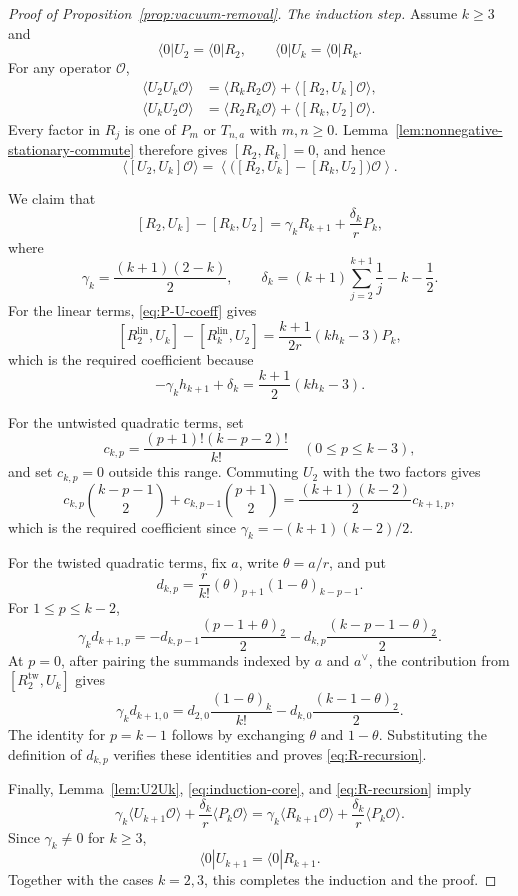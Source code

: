 \documentclass[letterpaper,12pt]{amsart}
\theoremstyle{definition}
\numberwithin{equation}{section}
\begin{document}
\begin{proof}[Proof of Proposition~\ref{prop:vacuum-removal}]
\smallskip
\noindent\emph{The induction step.}
Assume \(k\geq3\) and
\[
  \langle0|U_2=\langle0|R_2,
  \qquad
  \langle0|U_k=\langle0|R_k.
\]
For any operator \(\mathcal O\),
\begin{align*}
  \langle U_2U_k\mathcal O\rangle
  &=
  \langle R_kR_2\mathcal O\rangle
  +
  \langle[R_2,U_k]\mathcal O\rangle,\\
  \langle U_kU_2\mathcal O\rangle
  &=
  \langle R_2R_k\mathcal O\rangle
  +
  \langle[R_k,U_2]\mathcal O\rangle.
\end{align*}
Every factor in \(R_j\) is one of \(P_m\) or \(T_{n,a}\) with
\(m,n\geq0\).  Lemma~\ref{lem:nonnegative-stationary-commute} therefore
gives \([R_2,R_k]=0\), and hence
\begin{equation}\label{eq:induction-core}
  \langle[U_2,U_k]\mathcal O\rangle
  =
  \left\langle
    \bigl([R_2,U_k]-[R_k,U_2]\bigr)\mathcal O
  \right\rangle.
\end{equation}

We claim that
\begin{equation}\label{eq:R-recursion}
  [R_2,U_k]-[R_k,U_2]
  =
  \gamma_kR_{k+1}+\frac{\delta_k}{r}P_k,
\end{equation}
where
\[
  \gamma_k=\frac{(k+1)(2-k)}2,
  \qquad
  \delta_k=(k+1)\sum_{j=2}^{k+1}\frac1j-k-\frac12.
\]
For the linear terms, \eqref{eq:P-U-coeff} gives
\[
  [R_2^{\mathrm{lin}},U_k]-[R_k^{\mathrm{lin}},U_2]
  =
  \frac{k+1}{2r}(kh_k-3)P_k,
\]
which is the required coefficient because
\[
  -\gamma_kh_{k+1}+\delta_k
  =
  \frac{k+1}{2}(kh_k-3).
\]

For the untwisted quadratic terms, set
\[
  c_{k,p}
  =
  \frac{(p+1)!(k-p-2)!}{k!}
  \quad(0\leq p\leq k-3),
\]
and set \(c_{k,p}=0\) outside this range.  Commuting \(U_2\) with the
two factors gives
\[
  c_{k,p}\binom{k-p-1}{2}
  +
  c_{k,p-1}\binom{p+1}{2}
  =
  \frac{(k+1)(k-2)}2c_{k+1,p},
\]
which is the required coefficient since
\(\gamma_k=-(k+1)(k-2)/2\).

For the twisted quadratic terms, fix \(a\), write
\(\theta=a/r\), and put
\[
  d_{k,p}
  =
  \frac r{k!}(\theta)_{p+1}(1-\theta)_{k-p-1}.
\]
For \(1\leq p\leq k-2\),
\[
  \gamma_kd_{k+1,p}
  =
  -d_{k,p-1}\frac{(p-1+\theta)_2}{2}
  -
  d_{k,p}\frac{(k-p-1-\theta)_2}{2}.
\]
At \(p=0\), after pairing the summands indexed by \(a\) and \(a^\vee\),
the contribution from \([R_2^{\mathrm{tw}},U_k]\) gives
\[
  \gamma_kd_{k+1,0}
  =
  d_{2,0}\frac{(1-\theta)_k}{k!}
  -
  d_{k,0}\frac{(k-1-\theta)_2}{2}.
\]
The identity for \(p=k-1\) follows by exchanging \(\theta\) and
\(1-\theta\).  Substituting the definition of \(d_{k,p}\) verifies these
identities and proves \eqref{eq:R-recursion}.

Finally, Lemma~\ref{lem:U2Uk}, \eqref{eq:induction-core}, and
\eqref{eq:R-recursion} imply
\[
  \gamma_k\langle U_{k+1}\mathcal O\rangle
  +\frac{\delta_k}{r}\langle P_k\mathcal O\rangle
  =
  \gamma_k\langle R_{k+1}\mathcal O\rangle
  +\frac{\delta_k}{r}\langle P_k\mathcal O\rangle.
\]
Since \(\gamma_k\neq0\) for \(k\geq3\),
\[
  \langle0|U_{k+1}=\langle0|R_{k+1}.
\]
Together with the cases \(k=2,3\), this completes the induction and the
proof.
\end{proof}







\end{document}
